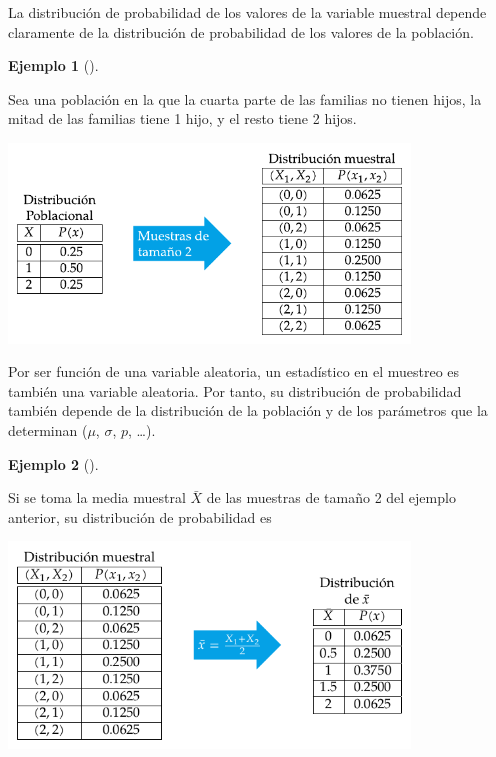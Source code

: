 \documentclass[
  a4paper,
]{scrreport}
\theoremstyle{plain}
\theoremstyle{definition}
\theoremstyle{definition}
\newtheorem{example}{Ejemplo}[chapter]
\theoremstyle{remark}
\begin{document}
La distribución de probabilidad de los valores de la variable muestral
depende claramente de la distribución de probabilidad de los valores de
la población.

\begin{example}[]\protect\hypertarget{exm-distribucion-muestral}{}\label{exm-distribucion-muestral}

Sea una población en la que la cuarta parte de las familias no tienen
hijos, la mitad de las familias tiene 1 hijo, y el resto tiene 2 hijos.

\begin{center}
\includegraphics[width=0.8\textwidth,height=\textheight]{img/estimacion/distribucion-variable-muestral.pdf}
\end{center}

\end{example}

Por ser función de una variable aleatoria, un estadístico en el muestreo
es también una variable aleatoria. Por tanto, su distribución de
probabilidad también depende de la distribución de la población y de los
parámetros que la determinan (\(\mu\), \(\sigma\), \(p\), \ldots).

\begin{example}[]\protect\hypertarget{exm-distribucion-media-muestral}{}\label{exm-distribucion-media-muestral}

Si se toma la media muestral \(\bar X\) de las muestras de tamaño 2 del
ejemplo anterior, su distribución de probabilidad es

\begin{center}
\includegraphics[width=0.8\textwidth,height=\textheight]{img/estimacion/distribucion-media.pdf}
\end{center}

\end{example}
\end{document}
